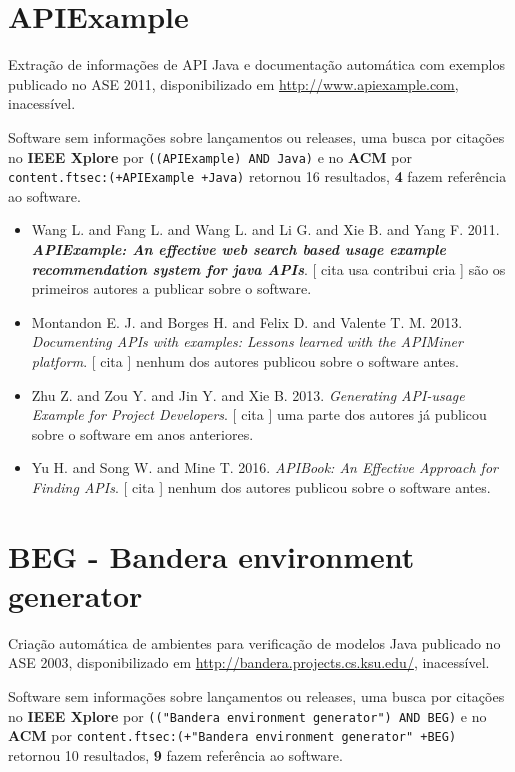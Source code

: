 \section{APIExample}

Extração de informações de API Java e documentação automática com exemplos
publicado no ASE 2011,
disponibilizado em \url{http://www.apiexample.com},
inacessível.

Software sem informações sobre lançamentos ou releases,
uma busca por citações no {\bf IEEE Xplore} por
\texttt{((APIExample) AND Java)}
e no {\bf ACM} por
\texttt{content.ftsec:(+APIExample +Java)}
retornou
16 resultados,
{\bf 4} fazem referência ao software.

\begin{itemize}
\item Wang L. and Fang L. and Wang L. and Li G. and Xie B. and Yang F.
      2011.
        \textbf{\textit{ APIExample: An effective web search based usage example recommendation system for java APIs}}.
      [
          cita
          usa
          contribui
          cria
      ]
são os primeiros autores a publicar sobre o software.
\item Montandon E. J. and Borges H. and Felix D. and Valente T. M.
      2013.
        \textit{ Documenting APIs with examples: Lessons learned with the APIMiner platform}.
      [
          cita
      ]
nenhum dos autores publicou sobre o software antes.
\item Zhu Z. and Zou Y. and Jin Y. and Xie B.
      2013.
        \textit{ Generating API-usage Example for Project Developers}.
      [
          cita
      ]
uma parte dos autores já publicou sobre o software em anos anteriores.
\item Yu H. and Song W. and Mine T.
      2016.
        \textit{ APIBook: An Effective Approach for Finding APIs}.
      [
          cita
      ]
nenhum dos autores publicou sobre o software antes.
\end{itemize}
\section{BEG - Bandera environment generator}

Criação automática de ambientes para verificação de modelos Java
publicado no ASE 2003,
disponibilizado em \url{http://bandera.projects.cs.ksu.edu/},
inacessível.

Software sem informações sobre lançamentos ou releases,
uma busca por citações no {\bf IEEE Xplore} por
\texttt{(("Bandera environment generator") AND BEG)}
e no {\bf ACM} por
\texttt{content.ftsec:(+"Bandera environment generator" +BEG)}
retornou
10 resultados,
{\bf 9} fazem referência ao software.

